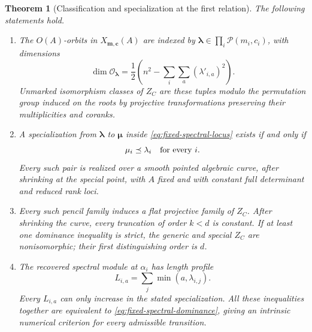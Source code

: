 \documentclass[11pt,reqno]{amsart}
\numberwithin{equation}{section}
\newtheorem{theorem}{Theorem}[section]
\theoremstyle{definition}\newtheorem{definition}[theorem]{Definition}
\theoremstyle{remark}\newtheorem{remark}[theorem]{Remark}
\begin{document}
\begin{theorem}[Classification and specialization at the first relation]
\label{thm:fixed-spectral-classification}
The following statements hold.
\begin{enumerate}
\item The \(O(A)\)-orbits in \(X_{\boldsymbol m,\boldsymbol c}(A)\)
are indexed by \(\boldsymbol\lambda\in\prod_i\mathcal P(m_i,c_i)\),
with dimensions
\begin{equation}\label{eq:fixed-spectral-orbit-dimension}
 \dim\mathcal O_{\boldsymbol\lambda}
 =\frac12\left(n^2-\sum_i\sum_a(\lambda'_{i,a})^2\right).
\end{equation}
Unmarked isomorphism classes of \(Z_C\) are these tuples modulo
the permutation group induced on the roots by projective transformations
preserving their multiplicities and coranks.
\item A specialization from \(\boldsymbol\lambda\) to
\(\boldsymbol\mu\) inside \eqref{eq:fixed-spectral-locus}
exists if and only if
\begin{equation}\label{eq:fixed-spectral-dominance}
                 \mu_i\preceq\lambda_i\quad\hbox{for every }i.
\end{equation}
Every such pair is realized over a smooth pointed algebraic curve,
after shrinking at the special point, with \(A\) fixed and with
constant full determinant and reduced rank loci.
\item Every such pencil family induces a flat projective family of
\(Z_C\). After shrinking the curve, every truncation of order
\(k<d\) is constant. If at least one dominance inequality is
strict, the generic and special \(Z_C\) are nonisomorphic;
their first distinguishing order is \(d\).
\item The recovered spectral module at \(\alpha_i\) has length
profile
\begin{equation}\label{eq:fixed-spectral-lengths}
                 L_{i,a}=\sum_j\min(a,\lambda_{i,j}).
\end{equation}
Every \(L_{i,a}\) can only increase in the stated specialization.
All these inequalities together are equivalent to
\eqref{eq:fixed-spectral-dominance}, giving an intrinsic numerical
criterion for every admissible transition.
\end{enumerate}
\end{theorem}
\end{document}
